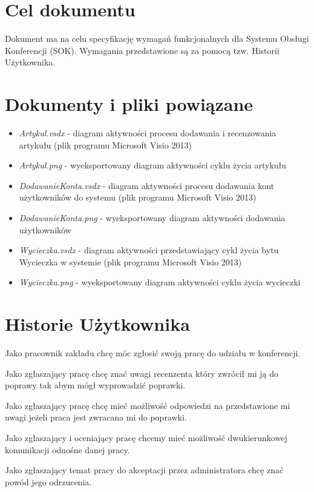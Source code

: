 \section{Cel dokumentu}
\suppressfloats[t]

Dokument ma na celu specyfikację wymagań funkcjonalnych dla Systemu Obsługi Konferencji (SOK). Wymagania przedstawione są za pomocą tzw. Historii Użytkownika.

\section{Dokumenty i pliki powiązane}

\begin{itemize}
  \item \textit{Artykul.vsdx} - diagram aktywności procesu dodawania i recenzowania artykułu (plik programu Microsoft Visio 2013)
  \item \textit{Artykul.png} - wyeksportowany diagram aktywności cyklu życia artykułu
  \item \textit{DodawanieKonta.vsdx} - diagram aktywności procesu dodawania kont użytkowników do systemu (plik programu Microsoft Visio 2013)
  \item \textit{DodawanieKonta.png} - wyeksportowany diagram aktywności dodawania użytkowników
  \item \textit{Wycieczka.vsdx} - diagram aktywności przedstawiający cykl życia bytu Wycieczka w systemie (plik programu Microsoft Visio 2013)
  \item \textit{Wycieczka.png} - wyeksportowany diagram aktywności cyklu życia wycieczki 
\end{itemize}

\section{Historie Użytkownika}

Jako pracownik zakładu chcę móc zgłosić swoją pracę do udziału w konferencji. 

Jako zgłaszający pracę chcę znać uwagi recenzenta który zwrócił mi ją do poprawy tak abym mógł wyprowadzić poprawki. 

Jako zgłaszający pracę chcę mieć możliwość odpowiedzi na przedstawione mi uwagi jeżeli praca jest zwracana mi do poprawki. 

Jako zgłaszający i oceniający pracę chcemy mieć możliwość dwukierunkowej komunikacji odnośne danej pracy. 

Jako zgłaszający temat pracy do akceptacji przez administratora chcę znać powód jego odrzucenia. 

